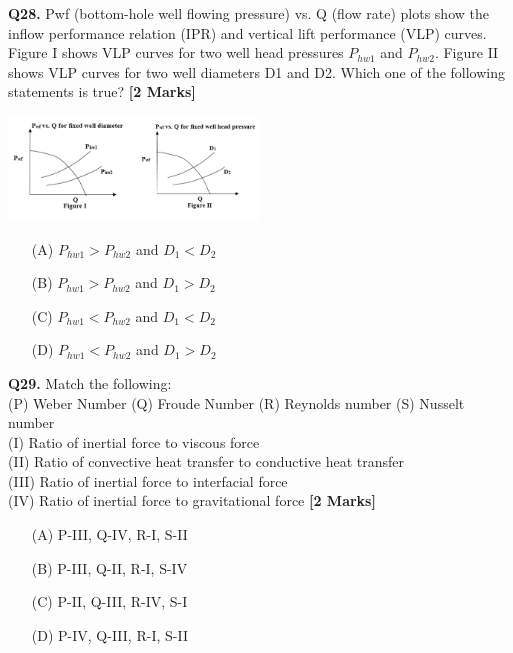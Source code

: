 \documentclass[11pt]{article}
\newcommand{\questionb}[2]{
    \noindent\textbf{Q#2.} #1 \hfill \textbf{[2 Marks]}
}
\begin{document}
\questionb{Pwf (bottom-hole well flowing pressure) vs. Q (flow rate) plots show the inflow performance relation (IPR) and vertical lift performance (VLP) curves. Figure I shows VLP curves for two well head pressures \( P_{hw1} \) and \( P_{hw2} \). Figure II shows VLP curves for two well diameters D1 and D2. Which one of the following statements is true?}{28}
\begin{center}
\includegraphics[width=0.5\textwidth]{figures/28.png}
\end{center}
\begin{enumerate}
    \item[(A)] \( P_{hw1} > P_{hw2} \) and \( D_1 < D_2 \)  
    \item[(B)] \( P_{hw1} > P_{hw2} \) and \( D_1 > D_2 \)  
    \item[(C)] \( P_{hw1} < P_{hw2} \) and \( D_1 < D_2 \)  
    \item[(D)] \( P_{hw1} < P_{hw2} \) and \( D_1 > D_2 \)  
\end{enumerate}
\vspace{0.5cm}

\questionb{Match the following: \\
(P) Weber Number (Q) Froude Number (R) Reynolds number (S) Nusselt number \\
(I) Ratio of inertial force to viscous force \\
(II) Ratio of convective heat transfer to conductive heat transfer \\
(III) Ratio of inertial force to interfacial force \\
(IV) Ratio of inertial force to gravitational force}{29}
\begin{enumerate}
    \item[(A)] P-III, Q-IV, R-I, S-II  
    \item[(B)] P-III, Q-II, R-I, S-IV  
    \item[(C)] P-II, Q-III, R-IV, S-I  
    \item[(D)] P-IV, Q-III, R-I, S-II  
\end{enumerate}
\vspace{0.5cm}
\end{document}

